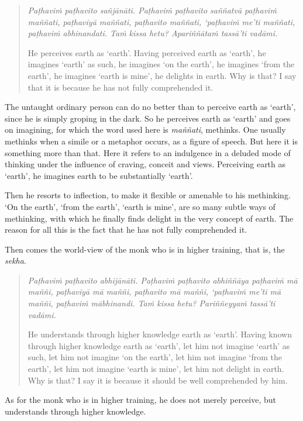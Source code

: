\begin{quote}
\emph{Paṭhaviṁ paṭhavito sañjānāti. Paṭhaviṁ paṭhavito saññatvā paṭhaviṁ maññati, paṭhaviyā maññati, paṭhavito maññati, `paṭhaviṁ me'ti maññati, paṭhaviṁ abhinandati. Taṁ kissa hetu? Apariññātaṁ tassā'ti vadāmi.}

He perceives earth as `earth'. Having perceived earth as `earth', he imagines `earth' as such, he imagines `on the earth', he imagines `from the earth', he imagines `earth is mine', he delights in earth. Why is that? I say that it is because he has not fully comprehended it.
\end{quote}

The untaught ordinary person can do no better than to perceive earth as `earth', since he is simply groping in the dark. So he perceives earth as `earth' and goes on imagining, for which the word used here is \emph{maññati}, methinks. One usually methinks when a simile or a metaphor occurs, as a figure of speech. But here it is something more than that. Here it refers to an indulgence in a deluded mode of thinking under the influence of craving, conceit and views. Perceiving earth as `earth', he imagines earth to be substantially `earth'.

Then he resorts to inflection, to make it flexible or amenable to his methinking. `On the earth', `from the earth', `earth is mine', are so many subtle ways of methinking, with which he finally finds delight in the very concept of earth. The reason for all this is the fact that he has not fully comprehended it.

Then comes the world-view of the monk who is in higher training, that is, the \emph{sekha}.

\begin{quote}
\emph{Paṭhaviṁ paṭhavito abhijānāti. Paṭhaviṁ paṭhavito abhiññāya paṭhaviṁ mā maññi, paṭhaviyā mā maññi, paṭhavito mā maññi, `paṭhaviṁ me'ti mā maññi, paṭhaviṁ mābhinandi. Taṁ kissa hetu? Pariññeyyaṁ tassā'ti vadāmi.}

He understands through higher knowledge earth as `earth'. Having known through higher knowledge earth as `earth', let him not imagine `earth' as such, let him not imagine `on the earth', let him not imagine `from the earth', let him not imagine `earth is mine', let him not delight in earth. Why is that? I say it is because it should be well comprehended by him.
\end{quote}

As for the monk who is in higher training, he does not merely perceive, but understands through higher knowledge.

